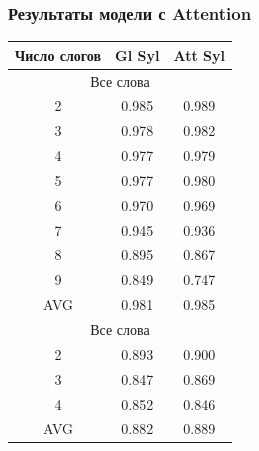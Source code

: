 \documentclass[russian]{beamer}
\begin{document}
\begin{frame}
\frametitle{Результаты модели с Attention}
\begin{table}[H]	
	\begin{small}
		\begin{center}
			\begin{tabular}{|c | c| c |}
				\hline
				
				Число слогов & Gl Syl & Att Syl \\ \hline
							\multicolumn{3}{|c|}{Все слова}                          \\ \hline
				
				2       & 0.985             & 0.989              \\ \hline
				3       & 0.978             & 0.982              \\ \hline
				4       & 0.977             & 0.979              \\ \hline
				5       & 0.977             & 0.980              \\ \hline
				6       & 0.970             & 0.969              \\ \hline
				7       & 0.945             & 0.936              \\ \hline
				8       & 0.895             & 0.867              \\ \hline
				9       & 0.849             & 0.747              \\ \hline
				AVG    & 0.981             & 0.985              \\ \hline
							\multicolumn{3}{|c|}{Все слова}                          \\ \hline
				
				2       & 0.893             & 0.900              \\ \hline
				3       & 0.847             & 0.869              \\ \hline
				4       & 0.852             & 0.846              \\ \hline
				AVG    & 0.882             & 0.889              \\ \hline
			\end{tabular}
		\end{center}
	\end{small}
	\label{table:global_att}
\end{table}


\end{frame}
\end{document}
